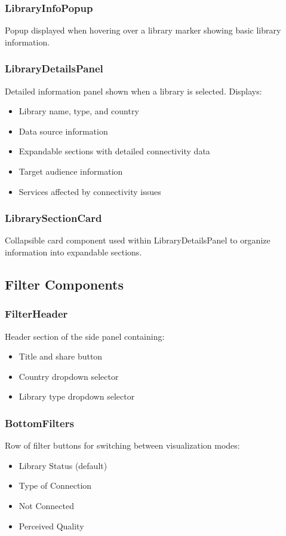 \documentclass[11pt,a4paper]{article}
\begin{document}
\subsubsection{LibraryInfoPopup}
Popup displayed when hovering over a library marker showing basic library information.

\subsubsection{LibraryDetailsPanel}
Detailed information panel shown when a library is selected. Displays:
\begin{itemize}
    \item Library name, type, and country
    \item Data source information
    \item Expandable sections with detailed connectivity data
    \item Target audience information
    \item Services affected by connectivity issues
\end{itemize}

\subsubsection{LibrarySectionCard}
Collapsible card component used within LibraryDetailsPanel to organize information into expandable sections.

\subsection{Filter Components}

\subsubsection{FilterHeader}
Header section of the side panel containing:
\begin{itemize}
    \item Title and share button
    \item Country dropdown selector
    \item Library type dropdown selector
\end{itemize}

\subsubsection{BottomFilters}
Row of filter buttons for switching between visualization modes:
\begin{itemize}
    \item Library Status (default)
    \item Type of Connection
    \item Not Connected
    \item Perceived Quality
\end{itemize}
\end{document}
